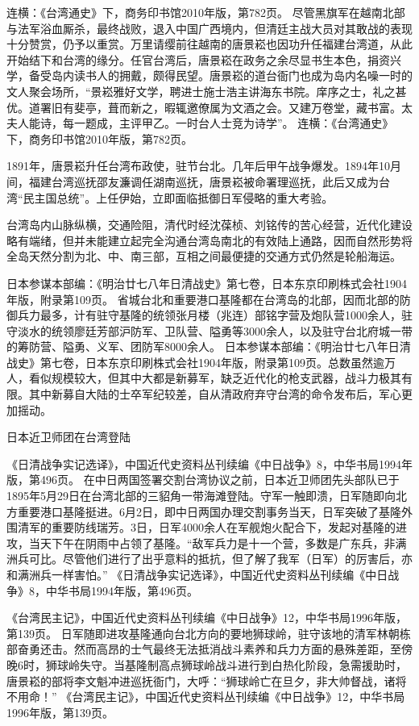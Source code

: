 \documentclass[12pt,UTF8]{ctexbook}
\begin{document}
连横：《台湾通史》下，商务印书馆2010年版，第782页。
尽管黑旗军在越南北部与法军浴血厮杀，最终战败，退入中国广西境内，但清廷主战大员对其敢战的表现十分赞赏，仍予以重赏。万里请缨前往越南的唐景崧也因功升任福建台湾道，从此开始结下和台湾的缘分。任官台湾后，唐景崧在政务之余尽显书生本色，捐资兴学，备受岛内读书人的拥戴，颇得民望。唐景崧的道台衙门也成为岛内名噪一时的文人聚会场所，“景崧雅好文学，聘进士施士浩主讲海东书院。庠序之士，礼之甚优。道署旧有斐亭，葺而新之，暇辄邀僚属为文酒之会。又建万卷堂，藏书富。太夫人能诗，每一题成，主评甲乙。一时台人士竞为诗学”。 连横：《台湾通史》下，商务印书馆2010年版，第782页。

1891年，唐景崧升任台湾布政使，驻节台北。几年后甲午战争爆发。1894年10月间，福建台湾巡抚邵友濂调任湖南巡抚，唐景崧被命署理巡抚，此后又成为台湾“民主国总统”。上任伊始，立即面临抵御日军侵略的重大考验。

台湾岛内山脉纵横，交通险阻，清代时经沈葆桢、刘铭传的苦心经营，近代化建设略有端绪，但并未能建立起完全沟通台湾岛南北的有效陆上通路，因而自然形势将全岛天然分割为北、中、南三部，互相之间最便捷的交通方式仍然是轮船海运。

日本参谋本部编：《明治廿七八年日清战史》第七卷，日本东京印刷株式会社1904年版，附录第109页。
省城台北和重要港口基隆都在台湾岛的北部，因而北部的防御兵力最多，计有驻守基隆的统领张月楼（兆连）部铭字营及炮队营1000余人，驻守淡水的统领廖廷芳部沪防军、卫队营、隘勇等3000余人，以及驻守台北府城一带的筹防营、隘勇、义军、团防军8000余人。 日本参谋本部编：《明治廿七八年日清战史》第七卷，日本东京印刷株式会社1904年版，附录第109页。总数虽然逾万人，看似规模较大，但其中大都是新募军，缺乏近代化的枪支武器，战斗力极其有限。其中新募自大陆的士卒军纪较差，自从清政府弃守台湾的命令发布后，军心更加摇动。


日本近卫师团在台湾登陆

《日清战争实记选译》，中国近代史资料丛刊续编《中日战争》8，中华书局1994年版，第496页。
在中日两国签署交割台湾协议之前，日本近卫师团先头部队已于1895年5月29日在台湾北部的三貂角一带海滩登陆。守军一触即溃，日军随即向北方重要港口基隆挺进。6月2日，即中日两国办理交割事务当天，日军突破了基隆外围清军的重要防线瑞芳。3日，日军4000余人在军舰炮火配合下，发起对基隆的进攻，当天下午在阴雨中占领了基隆。“敌军兵力是十一个营，多数是广东兵，非满洲兵可比。尽管他们进行了出乎意料的抵抗，但了解了我军（日军）的厉害后，亦和满洲兵一样害怕。” 《日清战争实记选译》，中国近代史资料丛刊续编《中日战争》8，中华书局1994年版，第496页。

《台湾民主记》，中国近代史资料丛刊续编《中日战争》12，中华书局1996年版，第139页。
日军随即进攻基隆通向台北方向的要地狮球岭，驻守该地的清军林朝栋部奋勇还击。然而高昂的士气最终无法抵消战斗素养和兵力方面的悬殊差距，至傍晚6时，狮球岭失守。当基隆制高点狮球岭战斗进行到白热化阶段，急需援助时，唐景崧的部将李文魁冲进巡抚衙门，大呼：“狮球岭亡在旦夕，非大帅督战，诸将不用命！” 《台湾民主记》，中国近代史资料丛刊续编《中日战争》12，中华书局1996年版，第139页。
\end{document}
